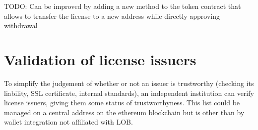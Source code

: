 \documentclass[a4paper]{article}
\newcommand{\todo}[1]{\textsf{TODO: #1}}
\begin{document}
\todo{Can be improved by adding a new method to the token contract that allows to transfer the license to a new address while directly approving withdrawal}

%
%
%
%

\section{Validation of license issuers}
\label{ch:licenseIssuerValidation}

To simplify the judgement of whether or not an issuer is trustworthy (checking its liability, SSL certificate, internal standards), an independent institution can verify license issuers, giving them some status of trustworthyness. This list could be managed on a central address on the ethereum blockchain but is other than by wallet integration not affiliated with LOB.


\end{document}
